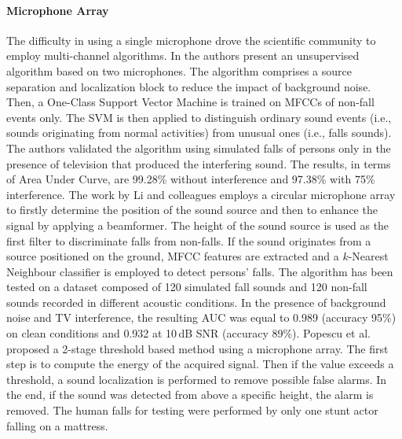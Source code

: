 \paragraph{Microphone Array}
The difficulty in using a single microphone drove the scientific community to employ multi-channel algorithms. In \cite{khan2015unsupervised} the authors present an unsupervised algorithm based on two microphones. The algorithm comprises a source separation and localization block to reduce the impact of background noise. Then, a One-Class Support Vector Machine is trained on MFCCs of non-fall events only. The SVM is then applied to distinguish ordinary sound events (i.e., sounds originating from normal activities) from unusual ones (i.e., falls sounds). The authors validated the algorithm using simulated falls of persons only in the presence of television that produced the interfering sound. The results, in terms of Area Under Curve, are 99.28\% without interference and 97.38\% with 75\% interference. The work by Li and colleagues \cite{li2012microphone} employs a circular microphone array to firstly determine the position of the sound source and then to enhance the signal by applying a beamformer. The height of the sound source is used as the first filter to discriminate falls from non-falls. If the sound originates from a source positioned on the ground, MFCC features are extracted and a $k$-Nearest Neighbour classifier is employed to detect persons' falls. The algorithm has been tested on a dataset composed of 120 simulated fall sounds and 120 non-fall sounds recorded in different acoustic conditions. In the presence of background noise and TV interference, the resulting AUC was equal to 0.989 (accuracy 95\%) on clean conditions and 0.932 at 10\,dB SNR (accuracy 89\%). 
Popescu et al. \cite{popescu2008acoustic} proposed a 2-stage threshold based method using a microphone array. The first step is to compute the energy of the acquired signal. Then if the value exceeds a threshold, a sound localization is performed to remove possible false alarms. In the end, if the sound was detected from above a specific height, the alarm is removed. The human falls for testing were performed by only one stunt actor falling on a mattress.

